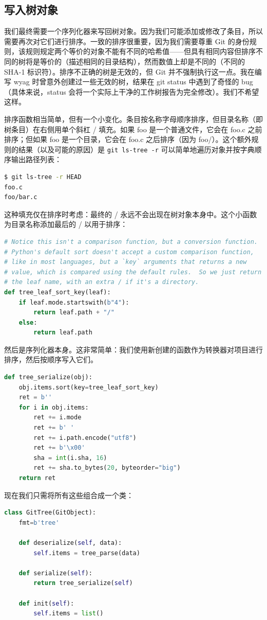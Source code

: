 \documentclass{ctexart}
\theoremstyle{remark}
\theoremstyle{warningstyle}
\theoremstyle{warningstyle}
\begin{document}
\subsection{写入树对象}
我们最终需要一个序列化器来写回树对象。因为我们可能添加或修改了条目，所以需要再次对它们进行排序。一致的排序很重要，因为我们需要尊重 Git 的身份规则，该规则规定两个等价的对象不能有不同的哈希值——但具有相同内容但排序不同的树将是等价的（描述相同的目录结构），然而数值上却是不同的（不同的 SHA-1 标识符）。排序不正确的树是无效的，但 Git 并不强制执行这一点。我在编写 wyag 时曾意外创建过一些无效的树，结果在 git status 中遇到了奇怪的 bug（具体来说，status 会将一个实际上干净的工作树报告为完全修改）。我们不希望这样。

排序函数相当简单，但有一个小变化。条目按名称字母顺序排序，但目录名称（即树条目）在右侧用单个斜杠 / 填充。如果 foo 是一个普通文件，它会在 foo.c 之前排序；但如果 foo 是一个目录，它会在 foo.c 之后排序（因为 foo/）。这个额外规则的结果（以及可能的原因）是 \lstinline|git ls-tree -r| 可以简单地遍历对象并按字典顺序输出路径列表：
\begin{lstlisting}[language=bash]
$ git ls-tree -r HEAD
foo.c
foo/bar.c
\end{lstlisting}
这种填充仅在排序时考虑：最终的 / 永远不会出现在树对象本身中。这个小函数为目录名称添加最后的 / 以用于排序：
\begin{lstlisting}[language=Python]
# Notice this isn't a comparison function, but a conversion function.
# Python's default sort doesn't accept a custom comparison function,
# like in most languages, but a `key` arguments that returns a new
# value, which is compared using the default rules.  So we just return
# the leaf name, with an extra / if it's a directory.
def tree_leaf_sort_key(leaf):
    if leaf.mode.startswith(b"4"):
        return leaf.path + "/"
    else:
        return leaf.path
\end{lstlisting}
然后是序列化器本身。这非常简单：我们使用新创建的函数作为转换器对项目进行排序，然后按顺序写入它们。
\begin{lstlisting}[language=Python]
def tree_serialize(obj):
    obj.items.sort(key=tree_leaf_sort_key)
    ret = b''
    for i in obj.items:
        ret += i.mode
        ret += b' '
        ret += i.path.encode("utf8")
        ret += b'\x00'
        sha = int(i.sha, 16)
        ret += sha.to_bytes(20, byteorder="big")
    return ret
\end{lstlisting}
现在我们只需将所有这些组合成一个类：
\begin{lstlisting}[language=Python]
class GitTree(GitObject):
    fmt=b'tree'

    def deserialize(self, data):
        self.items = tree_parse(data)

    def serialize(self):
        return tree_serialize(self)

    def init(self):
        self.items = list()
\end{lstlisting}
\end{document}
